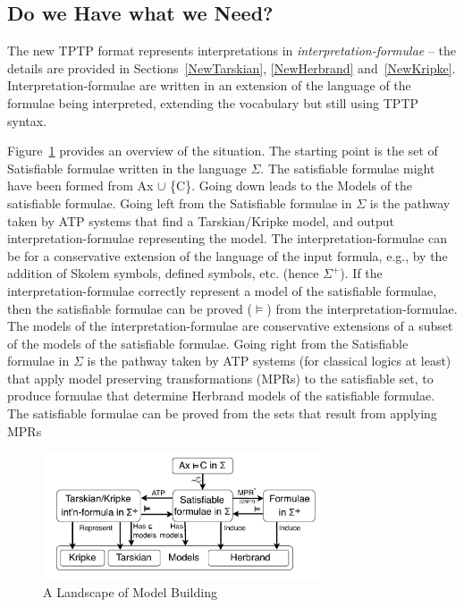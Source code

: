 \documentclass{easychair}
\begin{document}
\subsection{Do we Have what we Need?}
\label{HaveNeed}

The new TPTP format represents interpretations in \emph{interpretation-formulae} -- the details 
are provided in Sections~\ref{NewTarskian}, \ref{NewHerbrand} and~\ref{NewKripke}.
Interpretation-formulae are written in an extension of the language of the formulae being 
interpreted, extending the vocabulary but still using TPTP syntax.

Figure~\ref{ModelLandscape} provides an overview of the situation.
The starting point is the set of {\sf Satisfiable formulae} written in the language $\Sigma$. 
The satisfiable formulae might have been formed from 
{\sf Ax $\cup$ \{{\raisebox{0.4ex}{\texttildelow}}C\}}. 
Going down leads to the {\sf Models} of the satisfiable formulae.
Going left from the {\sf Satisfiable formulae in $\Sigma$} is the pathway taken by ATP systems 
that find a Tarskian/Kripke model, and output interpretation-formulae representing the model.
The interpretation-formulae can be for a conservative extension of the language of the input
formula, e.g., by the addition of Skolem symbols, defined symbols, etc. (hence $\Sigma^+$).
If the interpretation-formulae correctly represent a model of the satisfiable formulae, then
the satisfiable formulae can be proved ($\vDash$) from the interpretation-formulae.
The models of the interpretation-formulae are conservative extensions of a subset of the models 
of the satisfiable formulae.
Going right from the {\sf Satisfiable formulae in $\Sigma$} is the pathway taken by ATP systems
(for classical logics at least) that apply model preserving transformations ({\sf MPR}s) to the 
satisfiable set, to produce formulae that determine Herbrand models of the satisfiable formulae.
The satisfiable formulae can be proved from the sets that result from applying MPRs

\begin{figure}[htbp]
\centering
\includegraphics[width=0.75\textwidth]{ModelLandscape.pdf}
\caption{A Landscape of Model Building}
\label{ModelLandscape}
\end{figure}
\end{document}
